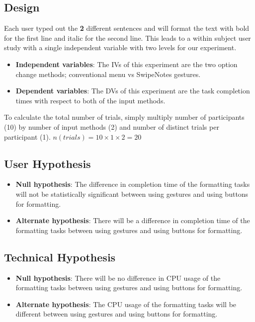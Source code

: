 \documentclass[conference]{IEEEtran}
\begin{document}
\subsection{Design}
Each user typed out the \textbf{2} different sentences and will format the text with bold for the first line and italic for the second line. This leads to a within subject user study with a single independent variable with two levels for our experiment.



\begin{itemize}
    \item \textbf{Independent variables}: The IVs of this experiment are the two option change methods; conventional menu vs SwipeNotes gestures.
    \item \textbf{Dependent variables}: The DVs of this experiment are the task completion times with respect to both of the input methods.
\end{itemize}
To calculate the total number of trials, simply multiply number of participants (10) by number of input methods (2) and number of distinct trials per participant (1).
$n(trials)=10\times 1\times 2=20$

\subsection{User Hypothesis}

\begin{itemize}
    \item \textbf{Null hypothesis}: The difference in completion time of the formatting tasks will not be statistically significant between using gestures and using buttons for formatting.
    \item \textbf{Alternate hypothesis}: There will be a difference in completion time of the formatting tasks between using gestures and using buttons for formatting.
\end{itemize}

\subsection{Technical Hypothesis}

\begin{itemize}
    \item \textbf{Null hypothesis}: There will be no difference in CPU usage of the formatting tasks between using gestures and using buttons for formatting.
    \item \textbf{Alternate hypothesis}: The CPU usage of the formatting tasks will be different between using gestures and using buttons for formatting.
\end{itemize}
\end{document}
